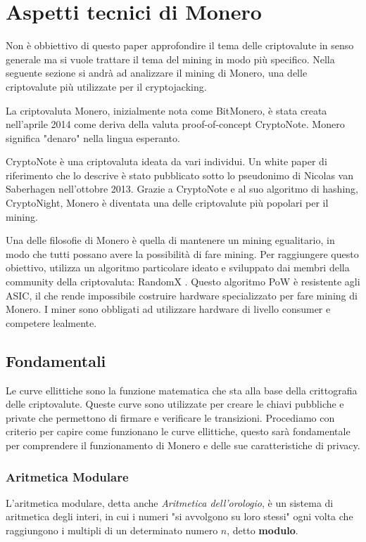 \documentclass[12pt,a4paper]{article}
\begin{document}
\section{Aspetti tecnici di Monero}\label{sec:aspetti_tecnici} 
Non è obbiettivo di questo paper approfondire il tema delle criptovalute in
senso generale ma si vuole trattare il tema del mining in modo più specifico.
Nella seguente sezione si andrà ad analizzare il mining di Monero, una delle
criptovalute più utilizzate per il cryptojacking.

La criptovaluta Monero, inizialmente nota come BitMonero, è stata creata
nell'aprile 2014 come deriva della valuta proof-of-concept CryptoNote. Monero
significa "denaro" nella lingua esperanto.

CryptoNote è una criptovaluta ideata da vari individui. Un white paper di
riferimento che lo descrive è stato pubblicato sotto lo pseudonimo di Nicolas
van Saberhagen nell'ottobre 2013. Grazie a CryptoNote e al suo algoritmo di
hashing, CryptoNight, Monero è diventata una delle criptovalute più popolari per
il mining.

Una delle filosofie di Monero è quella di mantenere un mining egualitario, in
modo che tutti possano avere la possibilità di fare mining. Per raggiungere
questo obiettivo, utilizza un algoritmo particolare ideato e sviluppato dai
membri della community della criptovaluta: RandomX . Questo algoritmo PoW è
resistente agli ASIC, il che rende impossibile costruire hardware specializzato
per fare mining di Monero. I miner sono obbligati ad utilizzare hardware di
livello consumer e competere lealmente.

\subsection{Fondamentali}
Le curve ellittiche sono la funzione matematica che sta alla base della
crittografia delle criptovalute. Queste curve sono utilizzate per creare le
chiavi pubbliche e private che permettono di firmare e verificare le
transizioni. Procediamo con criterio per capire come funzionano le curve
ellittiche, questo sarà fondamentale per comprendere il funzionamento di Monero
e delle sue caratteristiche di privacy.

\subsubsection{Aritmetica Modulare}
L'aritmetica modulare, detta anche \textit{Aritmetica dell'orologio}, è un
sistema di aritmetica degli interi, in cui i numeri "si avvolgono su loro
stessi" ogni volta che raggiungono i multipli di un determinato numero $ n $,
detto \textbf{modulo}.
\end{document}
